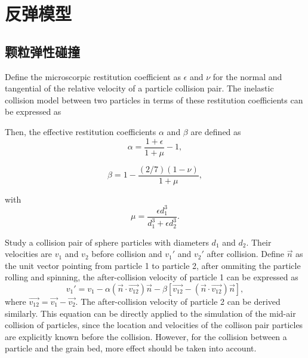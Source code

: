 \documentclass[12pt,a4paper]{article}
\begin{document}
\section{反弹模型}
\subsection{颗粒弹性碰撞}
Define the microscorpic restitution coefficient as $\epsilon$ and $\nu$ for the normal and tangential of the relative velocity of a particle collision pair. The inelastic collision model between two particles in terms of these restitution coefficients can be expressed as

Then, the effective restitution coefficients $\alpha$ and $\beta$ are defined as
\begin{equation}
    \alpha = \frac{1 + \epsilon}{1 + \mu} - 1,
\end{equation}

\begin{equation}
    \beta = 1 - \frac{(2/7)(1 - \nu)}{1 + \mu},
\end{equation}

with
\begin{equation}
    \mu = \frac{\epsilon d_1^3}{d_1^3 + \epsilon d_2^3}.
\end{equation}

Study a collision pair of sphere particles with diameters $d_1$ and $d_2$. Their velocities are $v_1$ and $v_2$ before collision and $v_1'$ and $v_2'$ after collision. Define $\overrightarrow{n}$ as the unit vector pointing from particle 1 to particle 2, after ommiting the particle rolling and spinning, the after-collision velocity of particle 1 can be expressed as
\begin{equation}
    v_1' = v_1 - \alpha \left ( \overrightarrow{n} \cdot \overrightarrow{v_{12}} \right ) \overrightarrow{n} - \beta \left [ \overrightarrow{v_{12}} - \left ( \overrightarrow{n} \cdot \overrightarrow{v_{12}} \right ) \overrightarrow{n} \right ],
\end{equation}
where $\overrightarrow{v_{12}} = \overrightarrow{v_1} - \overrightarrow{v_2}$. The after-collision velocity of particle 2 can be derived similarly. This equation can be directly applied to the simulation of the mid-air collision of particles, since the location and velocities of the collison pair particles are explicitly known before the collision. However, for the collision between a particle and the grain bed, more effect should be taken into account.
\end{document}
